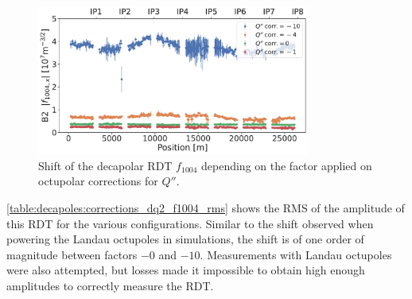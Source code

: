 \begin{figure}[!htb]
    \centering
    \includegraphics[width=0.8\textwidth]{./images/f1004/f1004x_mco_corr.pdf}
    \caption{Shift of the decapolar RDT $f_{1004}$ depending on the factor applied on octupolar
    corrections for $Q''$.}
    \label{decapoles:rdts:measured_f1004_mco}
\end{figure}

  
\cref{table:decapoles:corrections_dq2_f1004_rms} shows the RMS of the amplitude of this RDT for the 
various configurations. Similar to the shift observed when powering the Landau octupoles in
simulations, the shift is of one order of magnitude between factors $-0$ and $-10$. Measurements
with Landau octupoles were also attempted, but losses made it impossible to obtain high enough
amplitudes to correctly measure the RDT.




